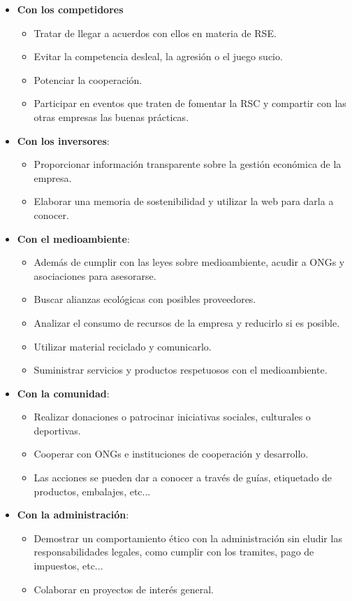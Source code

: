 \begin{itemize}
    \item \textbf{Con los competidores}
    \begin{itemize}
        \item Tratar de llegar a acuerdos con ellos en materia de RSE.
        \item Evitar la competencia desleal, la agresión o el juego sucio.
        \item Potenciar la cooperación.
        \item Participar en eventos que traten de fomentar la RSC y compartir con las otras empresas las buenas prácticas.
    \end{itemize}

    \item \textbf{Con los inversores}:
    \begin{itemize}
        \item Proporcionar información transparente sobre la gestión económica de la empresa.
        \item Elaborar una memoria de sostenibilidad y utilizar la web para darla a conocer.
    \end{itemize}

    \item \textbf{Con el medioambiente}:
    \begin{itemize}
        \item Además de cumplir con las leyes sobre medioambiente, acudir a ONGs y asociaciones para asesorarse.
        \item Buscar alianzas ecológicas con posibles proveedores.
        \item Analizar el consumo de recursos de la empresa y reducirlo si es posible.
        \item Utilizar material reciclado y comunicarlo.
        \item Suministrar servicios y productos respetuosos con el medioambiente.
    \end{itemize}

    \item \textbf{Con la comunidad}:
    \begin{itemize}
        \item Realizar donaciones o patrocinar iniciativas sociales, culturales o deportivas.
        \item Cooperar con ONGs e instituciones de cooperación y desarrollo.
        \item Las acciones se pueden dar a conocer a través de guías, etiquetado de productos, embalajes, etc...
    \end{itemize}

    \item \textbf{Con la administración}:
    \begin{itemize}
        \item Demostrar un comportamiento ético con la administración sin eludir las responsabilidades legales, como cumplir con los tramites, pago de impuestos, etc...
        \item Colaborar en proyectos de interés general.
    \end{itemize}
\end{itemize}

